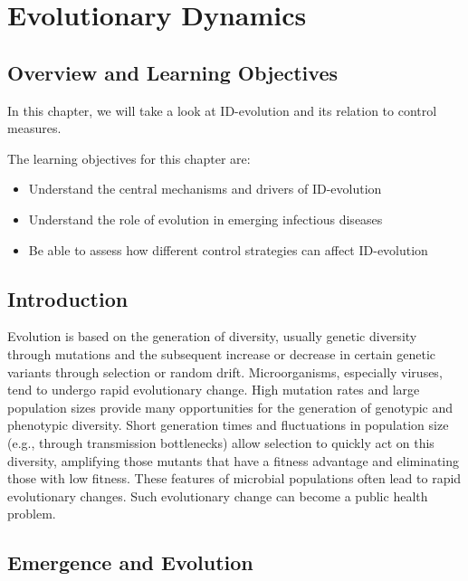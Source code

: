 \documentclass[]{book}
\providecommand{\tightlist}{%
  \setlength{\itemsep}{0pt}\setlength{\parskip}{0pt}}
\theoremstyle{definition}
\theoremstyle{definition}
\theoremstyle{definition}
\theoremstyle{remark}
\begin{document}
\chapter{Evolutionary Dynamics}\label{evolutionary-dynamics}

\section{Overview and Learning
Objectives}\label{overview-and-learning-objectives-12}

In this chapter, we will take a look at ID-evolution and its relation to
control measures.

The learning objectives for this chapter are:

\begin{itemize}
\tightlist
\item
  Understand the central mechanisms and drivers of ID-evolution
\item
  Understand the role of evolution in emerging infectious diseases
\item
  Be able to assess how different control strategies can affect
  ID-evolution
\end{itemize}

\section{Introduction}\label{introduction-11}

Evolution is based on the generation of diversity, usually genetic
diversity through mutations and the subsequent increase or decrease in
certain genetic variants through selection or random drift.
Microorganisms, especially viruses, tend to undergo rapid evolutionary
change. High mutation rates and large population sizes provide many
opportunities for the generation of genotypic and phenotypic diversity.
Short generation times and fluctuations in population size (e.g.,
through transmission bottlenecks) allow selection to quickly act on this
diversity, amplifying those mutants that have a fitness advantage and
eliminating those with low fitness. These features of microbial
populations often lead to rapid evolutionary changes. Such evolutionary
change can become a public health problem.

\section{Emergence and Evolution}\label{emergence-and-evolution}
\end{document}
